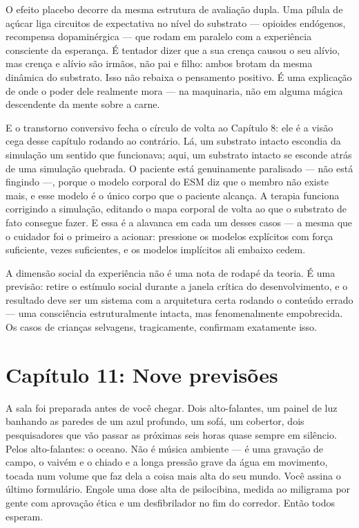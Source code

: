\documentclass[11pt, twoside, openright]{book}
\begin{document}
O efeito placebo decorre da mesma estrutura de avaliação dupla. Uma pílula de açúcar liga circuitos de expectativa no nível do substrato --- opioides endógenos, recompensa dopaminérgica --- que rodam em paralelo com a experiência consciente da esperança. É tentador dizer que a sua crença causou o seu alívio, mas crença e alívio são irmãos, não pai e filho: ambos brotam da mesma dinâmica do substrato. Isso não rebaixa o pensamento positivo. É uma explicação de onde o poder dele realmente mora --- na maquinaria, não em alguma mágica descendente da mente sobre a carne.

E o transtorno conversivo fecha o círculo de volta ao Capítulo 8: ele é a visão cega desse capítulo rodando ao contrário. Lá, um substrato intacto escondia da simulação um sentido que funcionava; aqui, um substrato intacto se esconde atrás de uma simulação quebrada. O paciente está genuinamente paralisado --- não está fingindo ---, porque o modelo corporal do ESM diz que o membro não existe mais, e esse modelo é o único corpo que o paciente alcança. A terapia funciona corrigindo a simulação, editando o mapa corporal de volta ao que o substrato de fato consegue fazer. E essa é a alavanca em cada um desses casos --- a mesma que o cuidador foi o primeiro a acionar: pressione os modelos explícitos com força suficiente, vezes suficientes, e os modelos implícitos ali embaixo cedem.

A dimensão social da experiência não é uma nota de rodapé da teoria. É uma previsão: retire o estímulo social durante a janela crítica do desenvolvimento, e o resultado deve ser um sistema com a arquitetura certa rodando o conteúdo errado --- uma consciência estruturalmente intacta, mas fenomenalmente empobrecida. Os casos de crianças selvagens, tragicamente, confirmam exatamente isso.


\chapter*{Capítulo 11: Nove previsões}

A sala foi preparada antes de você chegar. Dois alto-falantes, um painel de luz banhando as paredes de um azul profundo, um sofá, um cobertor, dois pesquisadores que vão passar as próximas seis horas quase sempre em silêncio. Pelos alto-falantes: o oceano. Não é música ambiente --- é uma gravação de campo, o vaivém e o chiado e a longa pressão grave da água em movimento, tocada num volume que faz dela a coisa mais alta do seu mundo. Você assina o último formulário. Engole uma dose alta de psilocibina, medida ao miligrama por gente com aprovação ética e um desfibrilador no fim do corredor. Então todos esperam.
\end{document}
